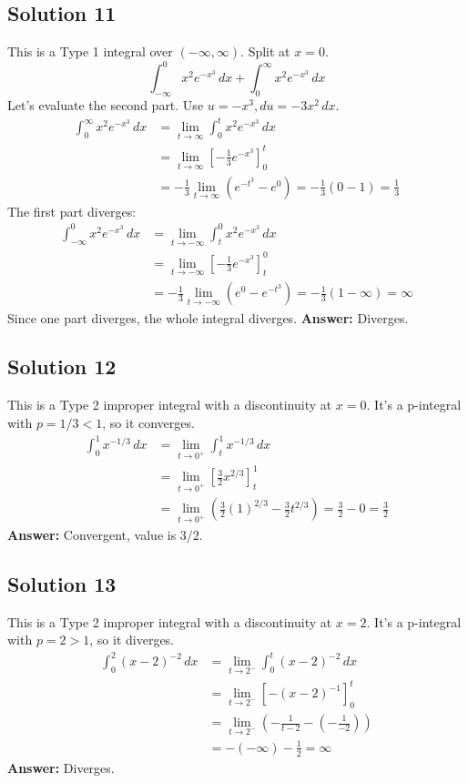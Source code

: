 \documentclass{article}
\begin{document}
\subsection*{Solution 11}
This is a Type 1 integral over $(-\infty, \infty)$. Split at $x=0$.
\[ \int_{-\infty}^{0} x^2 e^{-x^3} \,dx + \int_{0}^{\infty} x^2 e^{-x^3} \,dx \]
Let's evaluate the second part. Use $u=-x^3, du=-3x^2\,dx$.
\begin{align*}
\int_{0}^{\infty} x^2 e^{-x^3} \,dx &= \lim_{t \to \infty} \int_{0}^{t} x^2 e^{-x^3} \,dx \\
&= \lim_{t \to \infty} \left[ -\frac{1}{3} e^{-x^3} \right]_{0}^{t} \\
&= -\frac{1}{3} \lim_{t \to \infty} (e^{-t^3} - e^0) = -\frac{1}{3}(0-1) = \frac{1}{3}
\end{align*}
The first part diverges:
\begin{align*}
\int_{-\infty}^{0} x^2 e^{-x^3} \,dx &= \lim_{t \to -\infty} \int_{t}^{0} x^2 e^{-x^3} \,dx \\
&= \lim_{t \to -\infty} \left[ -\frac{1}{3} e^{-x^3} \right]_{t}^{0} \\
&= -\frac{1}{3} \lim_{t \to -\infty} (e^{0} - e^{-t^3}) = -\frac{1}{3}(1 - \infty) = \infty
\end{align*}
Since one part diverges, the whole integral diverges.
\textbf{Answer:} Diverges.

\subsection*{Solution 12}
This is a Type 2 improper integral with a discontinuity at $x=0$. It's a p-integral with $p=1/3 < 1$, so it converges.
\begin{align*}
\int_{0}^{1} x^{-1/3} \,dx &= \lim_{t \to 0^+} \int_{t}^{1} x^{-1/3} \,dx \\
&= \lim_{t \to 0^+} \left[ \frac{3}{2}x^{2/3} \right]_{t}^{1} \\
&= \lim_{t \to 0^+} \left( \frac{3}{2}(1)^{2/3} - \frac{3}{2}t^{2/3} \right) = \frac{3}{2} - 0 = \frac{3}{2}
\end{align*}
\textbf{Answer:} Convergent, value is $3/2$.

\subsection*{Solution 13}
This is a Type 2 improper integral with a discontinuity at $x=2$. It's a p-integral with $p=2 > 1$, so it diverges.
\begin{align*}
\int_{0}^{2} (x-2)^{-2} \,dx &= \lim_{t \to 2^-} \int_{0}^{t} (x-2)^{-2} \,dx \\
&= \lim_{t \to 2^-} \left[ -(x-2)^{-1} \right]_{0}^{t} \\
&= \lim_{t \to 2^-} \left( -\frac{1}{t-2} - \left(-\frac{1}{-2}\right) \right) \\
&= -(-\infty) - \frac{1}{2} = \infty
\end{align*}
\textbf{Answer:} Diverges.
\end{document}
